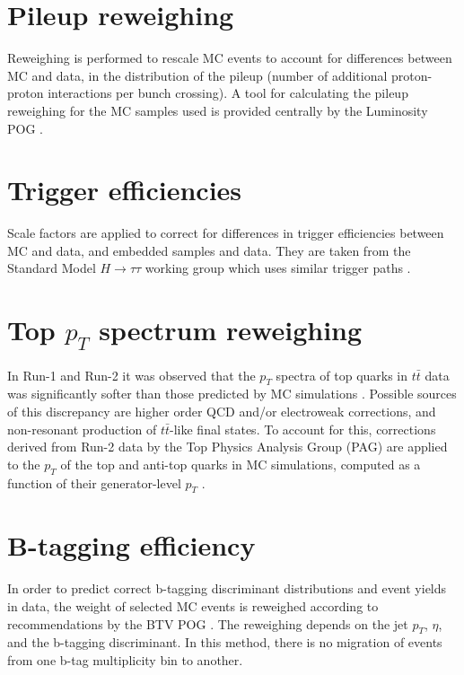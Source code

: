 \section{Pileup reweighing}
Reweighing is performed to rescale MC events to account for differences between MC and data, in the distribution of the pileup (number of additional proton-proton interactions per bunch crossing). A tool for calculating the pileup reweighing for the MC samples used is provided centrally by the Luminosity POG \cite{twiki_LUMI_POG_recommendation}.

\section{Trigger efficiencies}
Scale factors are applied to correct for differences in trigger efficiencies between MC and data, and embedded samples and data. They are taken from the Standard Model $H \rightarrow \tau\tau$ working group which uses similar trigger paths \cite{twiki_HiggsToTauTauWorkingLegacyRun2}.

\section{Top $p_{T}$ spectrum reweighing}
In Run-1 and Run-2 it was observed that the $p_{T}$ spectra of top quarks in $t\bar{t}$ data was significantly softer than those predicted by MC simulations \cite{twiki_Top_pt_reweighing}. Possible sources of this discrepancy are higher order QCD and/or electroweak corrections, and non-resonant production of $t\bar{t}$-like final states. To account for this, corrections derived from Run-2 data by the Top Physics Analysis Group (PAG) are applied to the $p_{T}$ of the top and anti-top quarks in MC simulations, computed as a function of their generator-level $p_{T}$ \cite{twiki_Top_pt_reweighing}.

\section{B-tagging efficiency}
In order to predict correct b-tagging discriminant distributions and event yields in data, the weight of selected MC events is reweighed according to recommendations by the BTV POG \cite{twiki_btag_SF_methods}. The reweighing depends on the jet $p_{T}$, $\eta$, and the b-tagging discriminant. In this method, there is no migration of events from one b-tag multiplicity bin to another.

